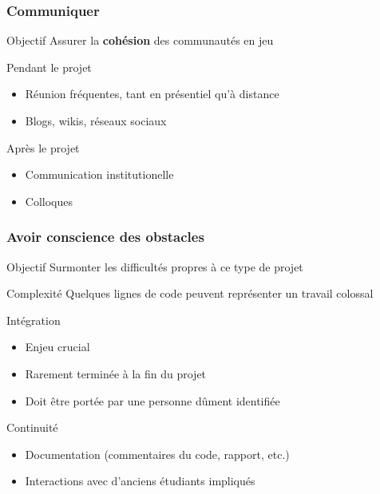 \documentclass[hyperref,french,usenames,xcolor=dvipsnames]{beamer}
\begin{document}
\frame
{
  \frametitle{Communiquer}

\begin{alertblock}{Objectif}
Assurer la \textbf{cohésion} des communautés en jeu 
\end{alertblock}

\begin{block}{Pendant le projet}
\begin{itemize}
\item Réunion fréquentes, tant en présentiel qu'à distance 
\item Blogs, wikis, réseaux sociaux
\end{itemize}
\end{block}

\begin{block}{Après le projet}
\begin{itemize}
\item Communication institutionelle 
\item Colloques 
\end{itemize}
\end{block}

}

\frame
{
  \frametitle{Avoir conscience des obstacles}

\begin{alertblock}{Objectif}
Surmonter les difficultés propres à ce type de projet 
\end{alertblock}

\begin{block}{Complexité}
Quelques lignes de code peuvent représenter un travail colossal 
\end{block}

\begin{block}{Intégration}
\begin{itemize}
\item Enjeu crucial 
\item Rarement terminée à la fin du projet
\item Doit être portée par une personne dûment identifiée
\end{itemize}
\end{block}

\begin{block}{Continuité}
\begin{itemize}
\item Documentation (commentaires du code, rapport, etc.) 
\item Interactions avec d'anciens étudiants impliqués 
\end{itemize}
\end{block}

}
\end{document}
